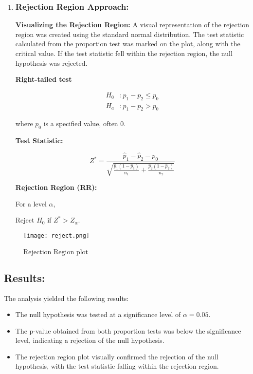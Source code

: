 \documentclass[oneside]{book}
\begin{document}
\begin{enumerate}
    \item\subsubsection*{Rejection Region Approach:}

 \textbf{Visualizing the Rejection Region:} A visual representation of the rejection region was created using the standard normal distribution. The test statistic calculated from the proportion test was marked on the plot, along with the critical value. If the test statistic fell within the rejection region, the null hypothesis was rejected.


\textbf{ Right-tailed test}

\[
\begin{aligned}
    H_0 & : p_1 - p_2 \leq p_0 \\
    H_a & : p_1 - p_2 > p_0
\end{aligned}
\]

where \( p_0 \) is a specified value, often 0.

\textbf{Test Statistic:}

\[
Z^* = \frac{{\hat{p}_1 - \hat{p}_2 - p_0}}{{\sqrt{\frac{{\hat{p}_1(1-\hat{p}_1)}}{{n_1}} + \frac{{\hat{p}_2(1-\hat{p}_2)}}{{n_2}}}}}
\]

\textbf{Rejection Region (RR):}

For a level \( \alpha \),

Reject \( H_0 \) if \( Z^* > Z_{\alpha} \).

\end{enumerate}

\begin{figure}[h!]
    \centering
    \texttt{[image: reject.png]}
    \caption{Rejection Region plot}
    \label{fig:enter-label}
\end{figure}

\subsection*{Results:}
The analysis yielded the following results:
\begin{itemize}
    \item The null hypothesis was tested at a significance level of $\alpha = 0.05$.
    \item The p-value obtained from both proportion tests was below the significance level, indicating a rejection of the null hypothesis.
    \item The rejection region plot visually confirmed the rejection of the null hypothesis, with the test statistic falling within the rejection region.
\end{itemize}
\end{document}
